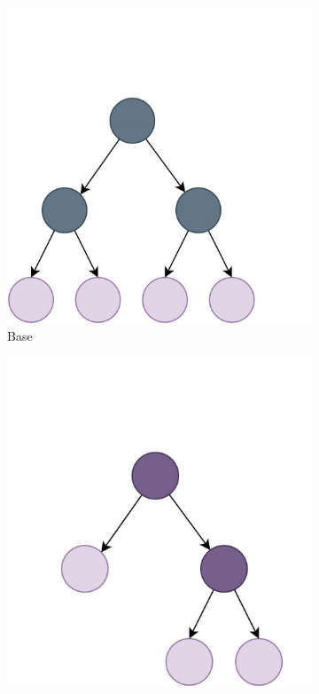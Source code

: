 \documentclass[preprint,11pt]{elsarticle}
\begin{document}
        \begin{figure}
            \centering
            \begin{subfigure}[b]{0.25\textwidth}
                \centering
                \includegraphics[width=\textwidth]{images/achituve21c1.jpg}
                \caption{Base}
                \label{fig:imagea2}
            \end{subfigure}
            \hfill
            \begin{subfigure}[b]{0.25\textwidth}
                \centering
                \includegraphics[width=\textwidth]{images/achituve21c2.jpg}

\end{subfigure}
\end{figure}
\end{document}
